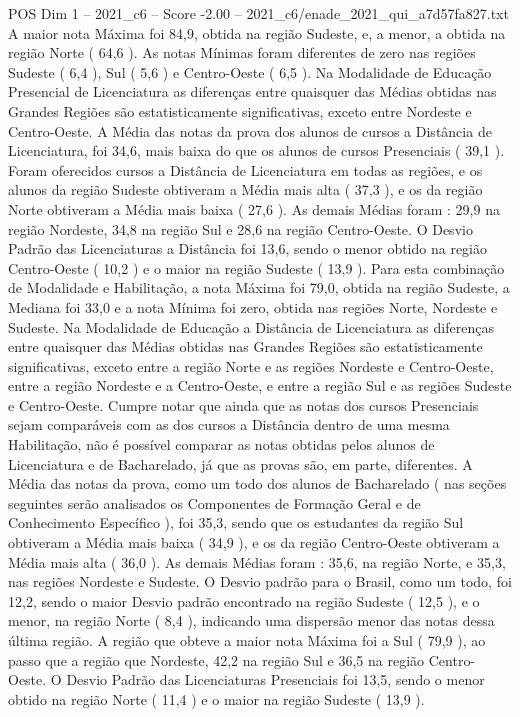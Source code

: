 \begin{textsample}{POS Dim 1 – 2021\_c6 – Score -2.00 – 2021\_c6/enade\_2021\_qui\_a7d57fa827.txt}
A maior nota Máxima foi 84,9, obtida na região Sudeste, e, a menor, a obtida na região Norte ( 64,6 ).
As notas Mínimas foram diferentes de zero nas regiões Sudeste ( 6,4 ), Sul ( 5,6 ) e Centro-Oeste ( 6,5 ).
Na Modalidade de Educação Presencial de Licenciatura as diferenças entre quaisquer das Médias obtidas nas Grandes Regiões são estatisticamente significativas, exceto entre Nordeste e Centro-Oeste.
A Média das notas da prova dos alunos de cursos a Distância de Licenciatura, foi 34,6, mais baixa do que os alunos de cursos Presenciais ( 39,1 ).
Foram oferecidos cursos a Distância de Licenciatura em todas as regiões, e os alunos da região Sudeste obtiveram a Média mais alta ( 37,3 ), e os da região Norte obtiveram a Média mais baixa ( 27,6 ).
As demais Médias foram : 29,9 na região Nordeste, 34,8 na região Sul e 28,6 na região Centro-Oeste.
O Desvio Padrão das Licenciaturas a Distância foi 13,6, sendo o menor obtido na região Centro-Oeste ( 10,2 ) e o maior na região Sudeste ( 13,9 ).
Para esta combinação de Modalidade e Habilitação, a nota Máxima foi 79,0, obtida na região Sudeste, a Mediana foi 33,0 e a nota Mínima foi zero, obtida nas regiões Norte, Nordeste e Sudeste.
Na Modalidade de Educação a Distância de Licenciatura as diferenças entre quaisquer das Médias obtidas nas Grandes Regiões são estatisticamente significativas, exceto entre a região Norte e as regiões Nordeste e Centro-Oeste, entre a região Nordeste e a Centro-Oeste, e entre a região Sul e as regiões Sudeste e Centro-Oeste.
Cumpre notar que ainda que as notas dos cursos Presenciais sejam comparáveis com as dos cursos a Distância dentro de uma mesma Habilitação, não é possível comparar as notas obtidas pelos alunos de Licenciatura e de Bacharelado, já que as provas são, em parte, diferentes.
A Média das notas da prova, como um todo dos alunos de Bacharelado ( nas seções seguintes serão analisados os Componentes de Formação Geral e de Conhecimento Específico ), foi 35,3, sendo que os estudantes da região Sul obtiveram a Média mais baixa ( 34,9 ), e os da região Centro-Oeste obtiveram a Média mais alta ( 36,0 ).
As demais Médias foram : 35,6, na região Norte, e 35,3, nas regiões Nordeste e Sudeste.
O Desvio padrão para o Brasil, como um todo, foi 12,2, sendo o maior Desvio padrão encontrado na região Sudeste ( 12,5 ), e o menor, na região Norte ( 8,4 ), indicando uma dispersão menor das notas dessa última região.
A região que obteve a maior nota Máxima foi a Sul ( 79,9 ), ao passo que a região que Nordeste, 42,2 na região Sul e 36,5 na região Centro-Oeste.
O Desvio Padrão das Licenciaturas Presenciais foi 13,5, sendo o menor obtido na região Norte ( 11,4 ) e o maior na região Sudeste ( 13,9 ).

\end{textsample}

